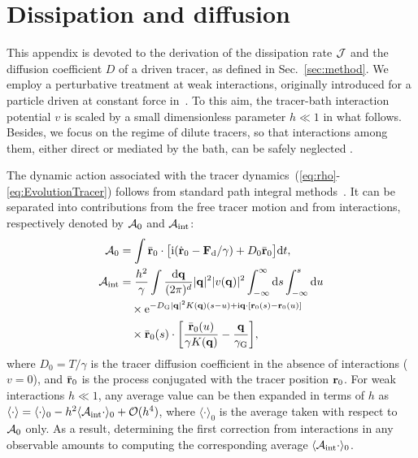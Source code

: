 \documentclass[superscriptaddress, twocolumn, prx, longbibliography, nofootinbib]{revtex4-1}
\begin{document}


\appendix

\section{Dissipation and diffusion}\label{app:diff}

This appendix is devoted to the derivation of the dissipation rate $\cal J$ and the diffusion coefficient $D$ of a driven tracer, as defined in Sec.~\ref{sec:method}. We employ a perturbative treatment at weak interactions, originally introduced for a particle driven at constant force in~\cite{Demery2011, Demery2014}. To this aim, the tracer-bath interaction potential $v$ is scaled by a small dimensionless parameter $h\ll1$ in what follows. Besides, we focus on the regime of dilute tracers, so that interactions among them, either direct or mediated by the bath, can be safely neglected .


The dynamic action associated with the tracer dynamics~(\ref{eq:rho}-\ref{eq:EvolutionTracer}) follows from standard path integral methods~\cite{Martin1973, Dominicis1975}. It can be separated into contributions from the free tracer motion and from interactions, respectively denoted by ${\cal A}_0$ and ${\cal A}_{\rm int}$:
\begin{equation}\label{eq:action_app}
	\begin{aligned}
		{\cal A}_0 &= \int \bar{\bf r}_0 \cdot \big[ {\rm i}(\dot{\bf r}_0 - {\bf F}_{\rm d}/\gamma) + D_0 \bar{\bf r}_0 \big] {\rm d}t ,
		\\
		{\cal A}_{\rm int} &= \frac{h^2}{\gamma} \int \frac{{\rm d}{\bf q}}{(2\pi)^d} |{\bf q}|^2 |v({\bf q})|^2 \int_{-\infty}^\infty {\rm d}s\int_{-\infty}^s{\rm d}u
		\\
		&\quad\times {\rm e}^{-D_{\rm G}|{\bf q}|^2K({\bf q})(s-u)+{\rm i}{\bf q}\cdot[{\bf r}_0(s)-{\bf r}_0(u)]}
		\\
		&\quad\times \bar{\bf r}_0(s) \cdot \bigg[ \frac{\bar{\bf r}_0(u)}{\gamma K({\bf q})} - \frac{{\bf q}}{\gamma_{\rm G}} \bigg] ,
	\end{aligned}
\end{equation}
where $D_0=T/\gamma$ is the tracer diffusion coefficient in the absence of interactions ($v=0$), and $\bar{\bf r}_0$ is the process conjugated with the tracer position ${\bf r}_0$. For weak interactions $h\ll1$, any average value can be then expanded in terms of $h$ as $\langle\cdot\rangle=\langle\cdot\rangle_0 - h^2 \langle{\cal A}_{\rm int}\cdot\rangle_0 + {\cal O}(h^4)$, where $\langle\cdot\rangle_0$ is the average taken with respect to ${\cal A}_0$ only. As a result, determining the first correction from interactions in any observable amounts to computing the corresponding average $\langle{\cal A}_{\rm int}\cdot\rangle_0$.
\end{document}

